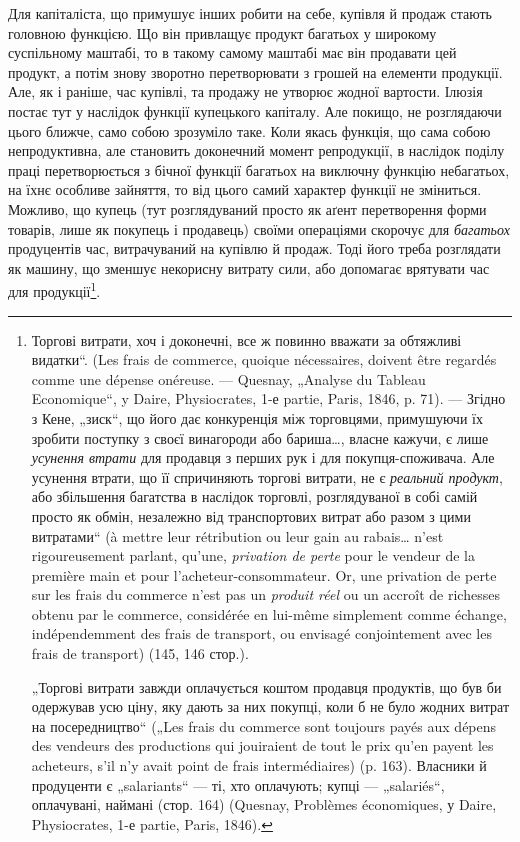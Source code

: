 Для капіталіста, що примушує інших робити на себе, купівля й
продаж стають головною функцією. Що він привлащує продукт багатьох
у широкому суспільному маштабі, то в такому самому маштабі має він
продавати цей продукт, а потім знову зворотно перетворювати з грошей
на елементи продукції. Але, як і раніше, час купівлі, та продажу не
утворює жодної вартости. Ілюзія постає тут у наслідок функції купецького
капіталу. Але покищо, не розглядаючи цього ближче, само собою
зрозуміло таке. Коли якась функція, що сама собою непродуктивна, але
становить доконечний момент репродукції, в наслідок поділу праці перетворюється
з бічної функції багатьох на виключну функцію небагатьох,
на їхнє особливе зайняття, то від цього самий характер функції не зміниться.
Можливо, що купець (тут розглядуваний просто як аґент перетворення
форми товарів, лише як покупець і продавець) своїми операціями
скорочує для \emph{багатьох} продуцентів час, витрачуваний на купівлю
й продаж. Тоді його треба розглядати як машину, що зменшує некорисну
витрату сили, або допомагає врятувати час для продукції\footnote{
Торгові витрати, хоч і доконечні, все ж повинно вважати за обтяжливі видатки“.
(Les frais de commerce, quoique nécessaires, doivent être regardés comme une
dépense onéreuse. — Quesnay, „Analyse du Tableau Economique“, y Daire, Physiocrates,
1-е partie, Paris, 1846, p. 71). — Згідно з Кене, „зиск“, що його дає конкуренція
між торговцями, примушуючи їх зробити поступку з своєї винагороди або бариша\dots{},
власне кажучи, є лише \emph{усунення втрати} для продавця з перших
рук і для покупця-споживача. Але усунення втрати, що її спричиняють торгові
витрати, не є \emph{реальний продукт}, або збільшення багатства в наслідок торговлі,
розглядуваної в собі самій просто як обмін, незалежно від транспортових витрат
або разом з цими витратами“ (à mettre leur rétribution ou leur gain au rabais\dots{}
n’est rigoureusement parlant, qu’une, \emph{privation de perte} pour le vendeur de la première
main et pour l’acheteur-consommateur. Or, une privation de perte sur les frais du
commerce n'est pas un \emph{produit réel} ou un accroît de richesses obtenu par le commerce,
considérée en lui-même simplement comme échange, indépendemment des frais de transport, ou envisagé
conjointement avec les frais de transport) (145, 146 стор.).

„Торгові витрати завжди оплачується коштом продавця продуктів, що був би
одержував усю ціну, яку дають за них покупці, коли б не було жодних витрат
на посередництво“ („Les frais du commerce sont toujours payés aux dépens des
vendeurs des productions qui jouiraient de tout le prix qu’en payent les acheteurs,
s’il n’y avait point de frais intermédiaires) (p. 163). Власники й продуценти є
„salariants“ — ті, хто оплачують; купці — „salariés“, оплачувані, наймані (стор. 164)
(Quesnay, Problèmes économiques, у Daire, Physiocrates, 1-е partie, Paris, 1846).
}.

